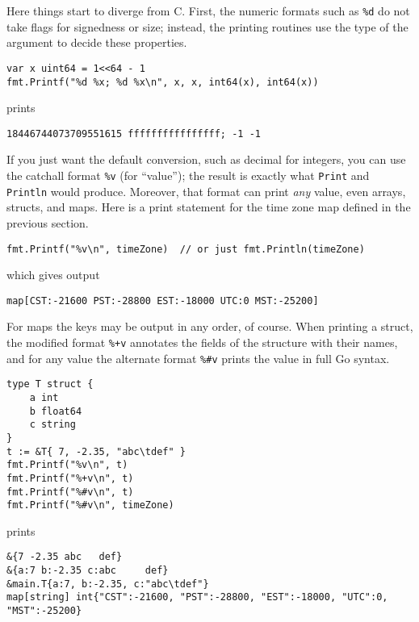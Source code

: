 Here things start to diverge from C. First, the numeric formats such as
\texttt{\%d} do not take flags for signedness or size; instead, the
printing routines use the type of the argument to decide these
properties.

\begin{Verbatim}[frame=single]
var x uint64 = 1<<64 - 1
fmt.Printf("%d %x; %d %x\n", x, x, int64(x), int64(x))
\end{Verbatim}

prints

\begin{Verbatim}[frame=single]
18446744073709551615 ffffffffffffffff; -1 -1
\end{Verbatim}

If you just want the default conversion, such as decimal for integers,
you can use the catchall format \texttt{\%v} (for ``value''); the result
is exactly what \texttt{Print} and \texttt{Println} would produce.
Moreover, that format can print \emph{any} value, even arrays, structs,
and maps. Here is a print statement for the time zone map defined in the
previous section.

\begin{Verbatim}[frame=single]
fmt.Printf("%v\n", timeZone)  // or just fmt.Println(timeZone)
\end{Verbatim}

which gives output

\begin{Verbatim}[frame=single]
map[CST:-21600 PST:-28800 EST:-18000 UTC:0 MST:-25200]
\end{Verbatim}

For maps the keys may be output in any order, of course. When printing a
struct, the modified format \texttt{\%+v} annotates the fields of the
structure with their names, and for any value the alternate format
\texttt{\%\#v} prints the value in full Go syntax.

\begin{Verbatim}[frame=single]
type T struct {
    a int
    b float64
    c string
}
t := &T{ 7, -2.35, "abc\tdef" }
fmt.Printf("%v\n", t)
fmt.Printf("%+v\n", t)
fmt.Printf("%#v\n", t)
fmt.Printf("%#v\n", timeZone)
\end{Verbatim}

prints

\begin{Verbatim}[frame=single]
&{7 -2.35 abc   def}
&{a:7 b:-2.35 c:abc     def}
&main.T{a:7, b:-2.35, c:"abc\tdef"}
map[string] int{"CST":-21600, "PST":-28800, "EST":-18000, "UTC":0, "MST":-25200}
\end{Verbatim}

